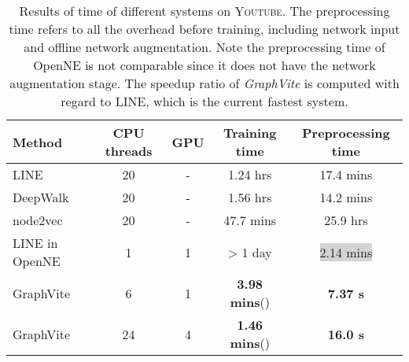 \documentclass[sigconf]{acmart}
\newcommand{\dataset}[1]{\textsc{#1}\xspace}
\newcommand{\best}[1]{\textbf{#1}}
\newcommand{\Graphy}{\textit{GraphVite}\xspace}
\begin{document}
\begin{table*}
    \centering
    \begin{tabular}{lcccc}
         \toprule
         Method                                 & CPU threads   & GPU       & Training time                     & Preprocessing time                \\
         \midrule
         LINE \cite{tang2015line}               & 20            & -         & 1.24 hrs                          & 17.4 mins                         \\
         DeepWalk \cite{perozzi2014deepwalk}    & 20            & -         & 1.56 hrs                          & 14.2 mins                         \\
         node2vec \cite{grover2016node2vec}     & 20            & -         & 47.7 mins                         & 25.9 hrs                          \\
         \midrule
         LINE in OpenNE \cite{thunlp2017openne} & 1             & 1         & > 1 day                           & \colorbox{lightgray}{2.14 mins}   \\
         \midrule
         GraphVite                              & 6             & 1         & \best{3.98 mins}()    & \best{7.37 s}                     \\
         GraphVite                              & 24            & 4         & \best{1.46 mins}()    & \best{16.0 s}                     \\
         \bottomrule
    \end{tabular}
    \caption{Results of time of different systems on \dataset{Youtube}. The preprocessing time refers to all the overhead before training, including network input and offline network augmentation. Note the preprocessing time of OpenNE is not comparable since it does not have the network augmentation stage. The speedup ratio of \Graphy is computed with regard to LINE, which is the current fastest system.}
    \label{tab:time_youtube}
\end{table*}
\end{document}
